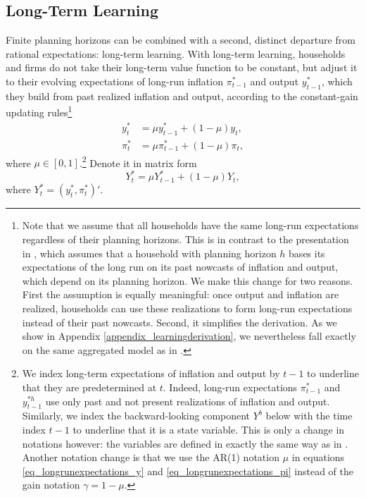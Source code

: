 \documentclass{article}
\begin{document}
\subsection{Long-Term Learning}
Finite planning horizons can be combined with a second, distinct departure from rational expectations: long-term learning. With long-term learning, households and firms do not take their long-term value function to be constant, but adjust it to their evolving expectations of long-run inflation $\pi_{t-1}^*$ and output $y_{t-1}^*$, which they build from past realized inflation and output, according to the constant-gain updating rules\footnote{Note that we assume that all households have the same long-run expectations regardless of their planning horizons. This is in contrast to the presentation in \cite{Woodford2019}, which assumes that a household with planning horizon $h$ bases its expectations of the long run on its past nowcasts of inflation and output, which depend on its planning horizon. We make this change for two reasons. First the assumption is equally meaningful: once output and inflation are realized, households can use these realizations to form long-run expectations instead of their past nowcasts. Second, it simplifies the derivation. As we show in Appendix \ref{appendix_learningderivation}, we nevertheless fall exactly on the same aggregated model as in \cite{Woodford2019}.}
\begin{align}
y_{t}^{*} &= \mu y_{t-1}^{*} + (1-\mu) y_t,\label{eq_longrunexpectations_y} \\
\pi_{t}^{*} &= \mu \pi_{t-1}^{*} + (1-\mu) \pi_t,\label{eq_longrunexpectations_pi}
\end{align}
where $\mu \in [0,1]$.\footnote{We index long-term expectations of inflation and output by $t-1$ to underline that they are predetermined at $t$. Indeed, long-run expectations $\pi_{t-1}^{*}$ and $y_{t-1}^{*h}$ use only past and not present realizations of inflation and output. Similarly, we index the backward-looking component $Y^b$ below with the time index $t-1$ to underline that it is a state variable. This is only a change in notations however: the variables are defined in exactly the same way as in \cite{Woodford2019}. Another notation change is that we use the AR(1) notation $\mu$ in equations \eqref{eq_longrunexpectations_y} and \eqref{eq_longrunexpectations_pi} instead of the gain notation $\gamma=1-\mu$.} Denote it in matrix form
\begin{equation}
Y_{t}^{*} = \mu Y_{t-1}^{*} + (1-\mu) Y_t,\label{eq_system_longtermexpectations}
\end{equation}
where $Y_t^{*} = (y_t^{*},\pi_t^{*})'$.
\end{document}
